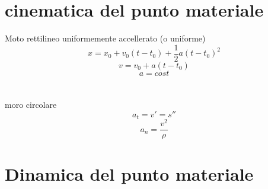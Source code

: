 \documentclass{article}
\begin{document}
\section{cinematica del punto materiale}
\large{Moto rettilineo uniformemente accellerato (o uniforme)}
\[x=x_0+v_0(t-t_0)+\frac{1}{2}a(t-t_0)^2\]
\[v=v_0+a(t-t_0)\]
\[a=cost\]\\\\
\large{moro circolare}
\[a_t=v'=s''\]
\[a_n=\frac{v^2}{\rho}\]

\section{Dinamica del punto materiale}
\end{document}
